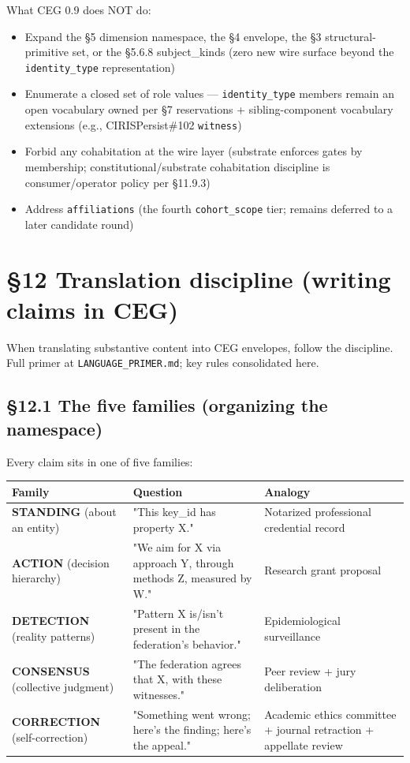 \documentclass[10pt]{article}
\begin{document}
What CEG 0.9 does NOT do:

\begin{itemize}\setlength\itemsep{0pt}
\item Expand the §5 dimension namespace, the §4 envelope, the §3 structural-primitive set, or the §5.6.8 subject\_kinds (zero new wire surface beyond the \texttt{identity\_type} representation)
\item Enumerate a closed set of role values — \texttt{identity\_type} members remain an open vocabulary owned per §7 reservations + sibling-component vocabulary extensions (e.g., CIRISPersist\#102 \texttt{witness})
\item Forbid any cohabitation at the wire layer (substrate enforces gates by membership; constitutional/substrate cohabitation discipline is consumer/operator policy per §11.9.3)
\item Address \texttt{affiliations} (the fourth \texttt{cohort\_scope} tier; remains deferred to a later candidate round)
\end{itemize}




\clearpage


\section*{§12 Translation discipline (writing claims in CEG)}


When translating substantive content into CEG envelopes, follow the discipline. Full primer at \texttt{LANGUAGE\_PRIMER.md}; key rules consolidated here.


\subsection*{§12.1 The five families (organizing the namespace)}


Every claim sits in one of five families:


{\footnotesize
\begin{longtable}{|p{5.33cm}|p{5.33cm}|p{5.33cm}|}\hline
\textbf{Family} & \textbf{Question} & \textbf{Analogy} \\ \hline\endhead
\textbf{STANDING} (about an entity) & "This key\_id has property X." & Notarized professional credential record \\ \hline
\textbf{ACTION} (decision hierarchy) & "We aim for X via approach Y, through methods Z, measured by W." & Research grant proposal \\ \hline
\textbf{DETECTION} (reality patterns) & "Pattern X is/isn't present in the federation's behavior." & Epidemiological surveillance \\ \hline
\textbf{CONSENSUS} (collective judgment) & "The federation agrees that X, with these witnesses." & Peer review + jury deliberation \\ \hline
\textbf{CORRECTION} (self-correction) & "Something went wrong; here's the finding; here's the appeal." & Academic ethics committee + journal retraction + appellate review \\ \hline
\end{longtable}}
\end{document}
